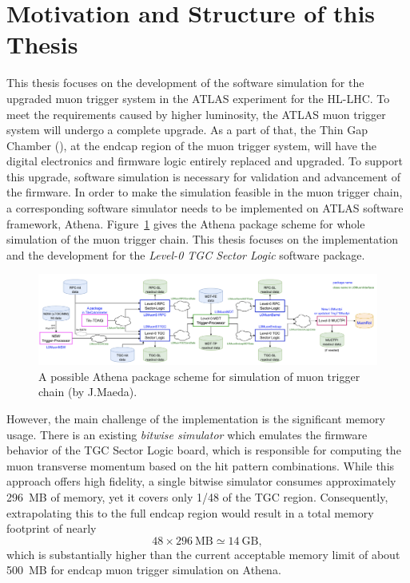 \section{Motivation and Structure of this Thesis} \label{sec:motivation}
This thesis focuses on the development of the software simulation for the upgraded muon trigger system in the ATLAS experiment for the HL-LHC. To meet the requirements caused by higher luminosity, the ATLAS muon trigger system will undergo a complete upgrade. As a part of that, the Thin Gap Chamber (\TGC), at the endcap region of the muon trigger system, will have the digital electronics and firmware logic entirely replaced and upgraded. To support this upgrade, software simulation is necessary for validation and advancement of the firmware. In order to make the simulation feasible in the muon trigger chain, a corresponding software simulator needs to be implemented on ATLAS software framework, Athena. Figure~\ref{fig:L0_trigger_chain} gives the Athena package scheme for whole simulation of the muon trigger chain. This thesis focuses on the implementation and the development for the \textit{Level-0 TGC Sector Logic} software package.

\begin{figure}[htbp]
  \centering
  \includegraphics[width=1.0\textwidth]{figs/chapter1/L0_trigger_chain.png}
  \caption{A possible Athena package scheme for simulation of muon trigger chain (by J.Maeda).}
  \label{fig:L0_trigger_chain}
\end{figure}

However, the main challenge of the implementation is the significant memory usage. There is an existing \textit{bitwise simulator} which emulates the firmware behavior of the TGC Sector Logic board, which is responsible for computing the muon transverse momentum based on the hit pattern combinations. While this approach offers high fidelity, a single bitwise simulator consumes approximately 296~MB of memory, yet it covers only 1/48 of the TGC region. Consequently, extrapolating this to the full endcap region would result in a total memory footprint of nearly 
\[
48 \times 296~\text{MB} \simeq 14~\text{GB},
\]
which is substantially higher than the current acceptable memory limit of about 500~MB for endcap muon trigger simulation on Athena.

